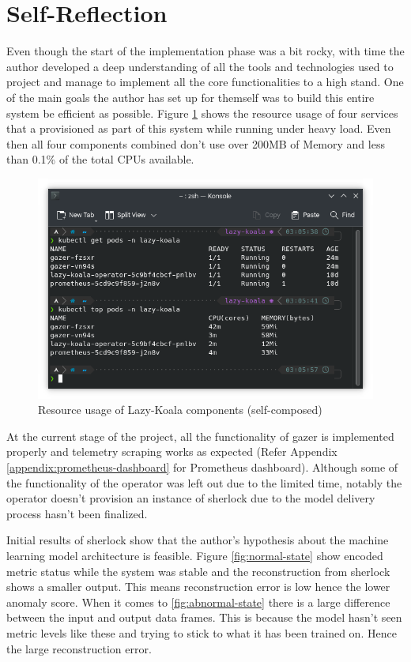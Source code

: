 \section{Self-Reflection}

Even though the start of the implementation phase was a bit rocky, with time the author developed a deep understanding of all the tools and technologies used to project and manage to implement all the core functionalities to a high stand. One of the main goals the author has set up for themself was to build this entire system be efficient as possible. Figure \ref{fig:service-benchmark} shows the resource usage of four services that a provisioned as part of this system while running under heavy load. Even then all four components combined don't use over 200MB of Memory and less than 0.1\% of the total CPUs available.

\begin{figure}[H]
    \includegraphics[width=15cm]{assets/implementation/service-benchmark.png}
    \caption{Resource usage of Lazy-Koala components (self-composed)}
    \label{fig:service-benchmark}
\end{figure}

At the current stage of the project, all the functionality of \ac{gazer} is implemented properly and telemetry scraping works as expected (Refer Appendix \ref{appendix:prometheus-dashboard} for Prometheus dashboard). Although some of the functionality of the operator was left out due to the limited time, notably the operator doesn't provision an instance of \ac{sherlock} due to the model delivery process hasn't been finalized.

Initial results of \ac{sherlock} show that the author's hypothesis about the machine learning model architecture is feasible. Figure \ref{fig:normal-state} show encoded metric status while the system was stable and the reconstruction from \ac{sherlock} shows a smaller output. This means reconstruction error is low hence the lower anomaly score. When it comes to \ref{fig:abnormal-state} there is a large difference between the input and output data frames. This is because the model hasn't seen metric levels like these and trying to stick to what it has been trained on. Hence the large reconstruction error.

